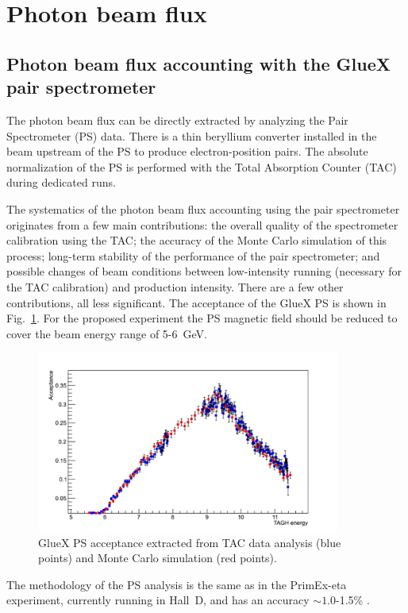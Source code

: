 \section{Photon beam flux  \label{sec:flux}   }

\subsection{Photon beam flux accounting with the GlueX pair spectrometer}
The photon beam flux can be directly extracted by analyzing the Pair Spectrometer (PS) data. There is a thin beryllium converter installed in
the beam upstream of the PS to produce electron-position pairs.
The absolute normalization of the PS
is performed with the Total Absorption Counter (TAC) during dedicated
runs.

The systematics of the photon beam flux accounting using the pair
spectrometer originates from a few main contributions: the overall
quality of the spectrometer calibration using the TAC; the accuracy
of the Monte Carlo
simulation of this process; long-term stability of the performance of the
pair spectrometer; and possible changes of beam conditions between
low-intensity running (necessary for the TAC
calibration) and production intensity.  There are a few other
contributions, all less significant. The acceptance of the GlueX PS \cite{hdnote3684} is shown
in Fig.~\ref{fig:psacc}. For the proposed experiment the PS magnetic field
should be reduced to cover the beam energy range of 5-6~GeV.
\begin{figure}[tpb]
\begin{center}
\includegraphics[width=10cm,angle=0]{figures/ps_acceptance.pdf}
\end{center}
\caption{GlueX PS acceptance extracted from TAC data analysis (blue
  points) and Monte Carlo simulation (red points).}
\label{fig:psacc}
\end{figure}
The methodology of the PS analysis is the same as in the
PrimEx-eta experiment, currently running in Hall~D, and has an accuracy
$\sim 1.0$-1.5\% \cite{PrimexDexp}.


